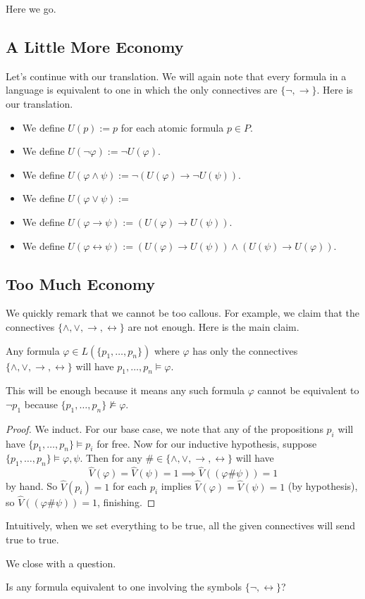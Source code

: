 \documentclass[../notes.tex]{subfiles}
\begin{document}

Here we go.

\subsection{A Little More Economy}
Let's continue with our translation. We will again note that every formula in a language is equivalent to one in which the only connectives are $\{\lnot,\to\}$. Here is our translation.
\begin{itemize}
	\item We define $U(p):=p$ for each atomic formula $p\in P$.
	\item We define $U(\lnot\varphi):=\lnot U(\varphi)$.
	\item We define $U(\varphi\land\psi):=\lnot(U(\varphi)\to\lnot U(\psi))$.
	\item We define $U(\varphi\lor\psi):=$
	\item We define $U(\varphi\to\psi):=(U(\varphi)\to U(\psi))$.
	\item We define $U(\varphi\leftrightarrow\psi):=(U(\varphi)\to U(\psi))\land(U(\psi)\to U(\varphi))$.
\end{itemize}

\subsection{Too Much Economy}
We quickly remark that we cannot be too callous. For example, we claim that the connectives $\{\land,\lor,\to,\leftrightarrow\}$ are not enough. Here is the main claim.
\begin{lemma}
	Any formula $\varphi\in L(\{p_1,\ldots,p_n\})$ where $\varphi$ has only the connectives $\{\land,\lor,\to,\leftrightarrow\}$ will have $p_1,\ldots,p_n\models\varphi$.
\end{lemma}
This will be enough because it means any such formula $\varphi$ cannot be equivalent to $\lnot p_1$ because $\{p_1,\ldots,p_n\}\nvDash\varphi$.
\begin{proof}
	We induct. For our base case, we note that any of the propositions $p_i$ will have $\{p_1,\ldots,p_n\}\models p_i$ for free. Now for our inductive hypothesis, suppose $\{p_1,\ldots,p_n\}\models\varphi,\psi$. Then for any $\#\in\{\land,\lor,\to,\leftrightarrow\}$ will have
	\[\hat V(\varphi)=\hat V(\psi)=1\implies\hat V((\varphi\#\psi))=1\]
	by hand. So $\hat V(p_i)=1$ for each $p_i$ implies $\hat V(\varphi)=\hat V(\psi)=1$ (by hypothesis), so $\hat V((\varphi\#\psi))=1$, finishing.
\end{proof}
\begin{remark}
	Intuitively, when we set everything to be true, all the given connectives will send true to true.
\end{remark}
We close with a question.
\begin{ques}
	Is any formula equivalent to one involving the symbols $\{\lnot,\leftrightarrow\}$?
\end{ques}
\end{document}
